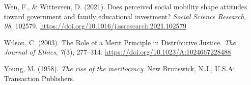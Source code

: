 \documentclass[
  12pt,
]{article}
\newlength{\cslhangindent}
\newenvironment{CSLReferences}[2] %
 {\begin{list}{}{%
  \setlength{\itemindent}{0pt}
  \setlength{\leftmargin}{0pt}
  \setlength{\parsep}{0pt}
  \ifodd #1
   \setlength{\leftmargin}{\cslhangindent}
   \setlength{\itemindent}{-1\cslhangindent}
  \fi
  \setlength{\itemsep}{#2\baselineskip}}}
 {\end{list}}
\begin{document}
\begin{CSLReferences}{1}{0}
Wen, F., \& Witteveen, D. (2021). Does perceived social mobility shape
attitudes toward government and family educational investment?
\emph{Social Science Research}, \emph{98}, 102579.
\url{https://doi.org/10.1016/j.ssresearch.2021.102579}

Wilson, C. (2003). The {Role} of a {Merit Principle} in {Distributive
Justice}. \emph{The Journal of Ethics}, \emph{7}(3), 277--314.
\url{https://doi.org/10.1023/A:1024667228488}

Young, M. (1958). \emph{The rise of the meritocracy}. New Brunswick,
N.J., U.S.A: Transaction Publishers.

\end{CSLReferences}
\end{document}
